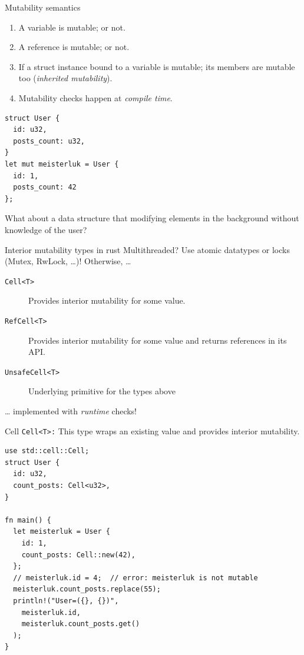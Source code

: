 \documentclass{beamer}
\begin{document}
\begin{frame}[fragile]{Mutability semantics}
  \begin{enumerate}
    \item A variable is mutable; or not.
    \item A reference is mutable; or not.
    \item If a struct instance bound to a variable is mutable; its members are mutable too (\emph{inherited mutability}).
    \item Mutability checks happen at \emph{compile time}.
  \end{enumerate}
\begin{verbatim}
struct User {
  id: u32,
  posts_count: u32,
}
let mut meisterluk = User {
  id: 1,
  posts_count: 42
};
\end{verbatim}
\end{frame}

\begin{frame}[standout]
  What about a data structure that modifying elements in the background without knowledge of the user?
\end{frame}

\begin{frame}[fragile]{Interior mutability types in rust}
  Multithreaded? Use atomic datatypes or locks (Mutex, RwLock, \dots)!
  Otherwise, \dots

  \begin{description}
    \item[\texttt{Cell<T>}] Provides interior mutability for some value.
    \item[\texttt{RefCell<T>}] Provides interior mutability for some value and returns references in its API.
    \item[\texttt{UnsafeCell<T>}] Underlying primitive for the types above
  \end{description}
  \dots{} implemented with \emph{runtime} checks!
\end{frame}

\begin{frame}[fragile]{Cell}
  \texttt{Cell<T>:} This type wraps an existing value and provides interior mutability.

  \begin{verbatim}
use std::cell::Cell;
struct User {
  id: u32,
  count_posts: Cell<u32>,
}

fn main() {
  let meisterluk = User {
    id: 1,
    count_posts: Cell::new(42),
  };
  // meisterluk.id = 4;  // error: meisterluk is not mutable
  meisterluk.count_posts.replace(55);
  println!("User=({}, {})",
    meisterluk.id,
    meisterluk.count_posts.get()
  );
}
  \end{verbatim}
\end{frame}
\end{document}
